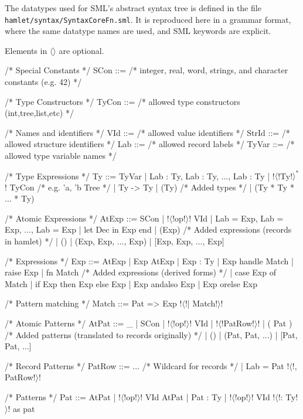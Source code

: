 \documentclass[a4paper,11pt]{article}
\begin{document}
The datatypes used for SML's abstract syntax tree is defined in the file
\texttt{hamlet/syntax/SyntaxCoreFn.sml}. It is reproduced here in a grammar
format, where the same datatype names are used, and SML keywords are explicit.

Elements in $\langle\rangle$ are optional.

\begin{grm}
/* Special Constants */
SCon ::= /* integer, real, word, strings, 
            and character constants (e.g. 42) */

/* Type Constructors */
TyCon ::= /* allowed type constructors (int,tree,list,etc) */

/* Names and identifiers */
VId   ::= /* allowed value identifiers */
StrId ::= /* allowed structure identifiers */
Lab   ::= /* allowed record labels */
TyVar ::= /* allowed type variable names */

/* Type Expressions */
Ty ::= TyVar
     | { Lab : Ty, Lab : Ty, ..., Lab : Ty }
     | !$\langle$!Ty!$\rangle^*$! TyCon /* e.g. 'a, 'b Tree */
     | Ty -> Ty
     | (Ty)
     /* Added types */
     | (Ty * Ty * ... * Ty)

/* Atomic Expressions */
AtExp ::= SCon 
        | !$\langle$!op!$\rangle$! VId 
        | {Lab = Exp, Lab = Exp, ..., Lab = Exp} 
        | let Dec in Exp end 
        | (Exp) 
        /* Added expressions (records in hamlet) */
        | () 
        | (Exp, Exp, ..., Exp) 
        | [Exp, Exp, ..., Exp]

/* Expressions */
Exp ::= AtExp 
      | Exp AtExp 
      | Exp : Ty 
      | Exp handle Match
      | raise Exp 
      | fn Match
      /* Added expressions (derived forms) */
      | case Exp of Match 
      | if Exp then Exp else Exp
      | Exp andalso Exp 
      | Exp orelse Exp

/* Pattern matching */
Match ::= Pat => Exp !$\langle$!| Match!$\rangle$!

/* Atomic Patterns */
AtPat ::= _ 
        | SCon
        | !$\langle$!op!$\rangle$! VId 
        | { !$\langle$!PatRow!$\rangle$! }
        | ( Pat )
        /* Added patterns (translated to records originally) */
        | ()
        | (Pat, Pat, ...)
        | [Pat, Pat, ...]

/* Record Patterns */
PatRow ::= ... /* Wildcard for records */
         | Lab = Pat !$\langle$!, PatRow!$\rangle$!

/* Patterns */
Pat ::= AtPat
      | !$\langle$!op!$\rangle$! VId AtPat
      | Pat : Ty
      | !$\langle$!op!$\rangle$! VId !$\langle$!: Ty!$\rangle$! as pat


\end{grm}
\end{document}
